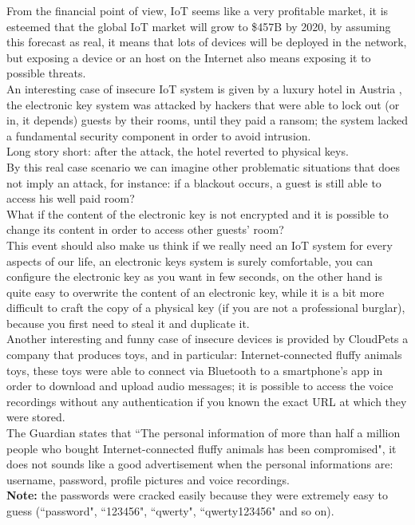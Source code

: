 \documentclass[12pt]{report}
\begin{document}
From the financial point of view, IoT seems like a very profitable market, it is esteemed that the global IoT market will grow to \$457B by 2020\cite{forbes}, by assuming this forecast as real, it means that lots of devices will be deployed in the network, but exposing a device
or an host on the Internet also means exposing it to possible threats.\\
An interesting case of insecure IoT system is given by a luxury hotel in Austria \cite{whydoiot}, the electronic key system was attacked
by hackers that were able to lock out (or in, it depends) guests by their rooms, until they paid a ransom; the system lacked a fundamental security
component in order to avoid intrusion.\\
Long story short: after the attack, the hotel reverted to physical keys.\\
By this real case scenario we can imagine other problematic situations that does not imply an attack, for instance: if a blackout occurs, a guest is still able to access his well paid room?\\
What if the content of the electronic key is not encrypted and it is possible to change its content in order to access other guests' room?\\
This event should also make us think if we really need an IoT system for every aspects of our life, an electronic keys system is
surely comfortable, you can configure the electronic key as you want in few seconds, on the other hand is quite easy to overwrite the content
of an electronic key, while it is a bit more difficult to craft the copy of a physical key (if you are not a professional burglar), because you first need to steal it and duplicate it.\\
Another interesting and funny case of insecure devices is provided by CloudPets\cite{toys} a company that produces toys, and in particular: Internet-connected fluffy animals toys,
these toys were able to connect via Bluetooth to a smartphone's app in order to download and upload audio messages; it is possible to access the voice recordings without any authentication if you known the exact URL at which they were stored.\\
The Guardian states that ``The personal information of more than half a million people who bought Internet-connected fluffy animals has been compromised", it does not sounds like a good advertisement
when the personal informations are: username, password, profile pictures and voice recordings.\\
\textbf{Note:} the passwords were cracked easily because they were extremely easy to guess (``password", ``123456", ``qwerty", ``qwerty123456" and so on).\\
\end{document}
